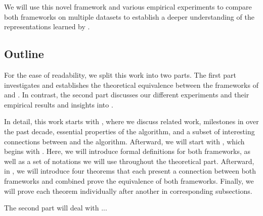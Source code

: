 We will use this novel framework and various empirical experiments to compare both frameworks on multiple datasets to establish a deeper understanding of the representations learned by \gnns.

\subsection{Outline}
For the ease of readability, we split this work into two parts. The first part investigates and establishes the theoretical equivalence between the frameworks of \wlnn and \gnns. In contrast, the second part discusses our different experiments and their empirical results and insights into \gnns.

In detail, this work starts with , where we discuss related work, milestones in \gnns over the past decade, essential properties of the \wl algorithm, and a subset of interesting connections between \gnns and the \wl algorithm. Afterward, we will start with , which begins with . Here, we will introduce formal definitions for both frameworks, as well as a set of notations we will use throughout the theoretical part. Afterward, in , we will introduce four theorems that each present a connection between both frameworks and combined prove the equivalence of both frameworks. Finally, we will prove each theorem individually after another in corresponding subsections.

The second part will deal with ...